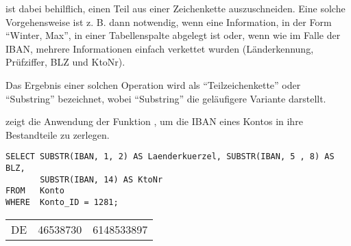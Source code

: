  ist dabei behilflich, einen Teil aus einer Zeichenkette auszuschneiden. Eine solche Vorgehensweise ist z. B. dann notwendig, wenn eine Information, in der Form \enquote{Winter, Max}, in einer Tabellenspalte abgelegt ist oder, wenn wie im Falle der IBAN, mehrere Informationen einfach verkettet wurden (Länderkennung, Prüfziffer, BLZ und KtoNr).
\begin{merke}
    Das Ergebnis einer solchen Operation wird als \enquote{Teilzeichenkette} oder \enquote{Substring} bezeichnet, wobei \enquote{Substring} die geläufigere Variante darstellt.
\end{merke}
 zeigt die Anwendung der Funktion , um die IBAN eines Kontos in ihre Bestandteile zu zerlegen.
\begin{lstlisting}[language=oracle_sql,caption={Die Anwendung der Funktion \languageorasql{SUBSTR}},label=sql03_05]
SELECT SUBSTR(IBAN, 1, 2) AS Laenderkuerzel, SUBSTR(IBAN, 5 , 8) AS BLZ,
       SUBSTR(IBAN, 14) AS KtoNr
FROM   Konto
WHERE  Konto_ID = 1281;
          \end{lstlisting}
\begin{center}
    \begin{small}
        \tablehead{}
        \begin{oraclesql}
            \begin{supertabular}{lrr}
                DE & 46538730 & 6148533897 \\
            \end{supertabular}
        \end{oraclesql}
    \end{small}
\end{center}
\clearpage
